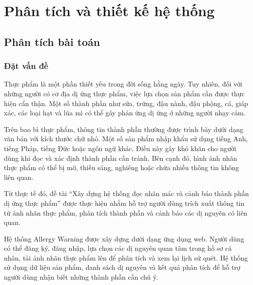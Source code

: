 
\chapter{Phân tích và thiết kế hệ thống}
\setlength{\parindent}{0pt}


\section{Phân tích bài toán}

\subsection{Đặt vấn đề}

Thực phẩm là một phần thiết yếu trong đời sống hằng ngày. Tuy nhiên, đối với những người có cơ địa dị ứng thực phẩm, việc lựa chọn sản phẩm cần được thực hiện cẩn thận. Một số thành phần như sữa, trứng, đậu nành, đậu phộng, cá, giáp xác, các loại hạt và lúa mì có thể gây phản ứng dị ứng ở những người nhạy cảm.

Trên bao bì thực phẩm, thông tin thành phần thường được trình bày dưới dạng văn bản với kích thước chữ nhỏ. Một số sản phẩm nhập khẩu sử dụng tiếng Anh, tiếng Pháp, tiếng Đức hoặc ngôn ngữ khác. Điều này gây khó khăn cho người dùng khi đọc và xác định thành phần cần tránh. Bên cạnh đó, hình ảnh nhãn thực phẩm có thể bị mờ, thiếu sáng, nghiêng hoặc chứa nhiều thông tin không liên quan.

Từ thực tế đó, đề tài ``Xây dựng hệ thống đọc nhãn mác và cảnh báo thành phần dị ứng thực phẩm'' được thực hiện nhằm hỗ trợ người dùng trích xuất thông tin từ ảnh nhãn thực phẩm, phân tích thành phần và cảnh báo các dị nguyên có liên quan.

Hệ thống Allergy Warning được xây dựng dưới dạng ứng dụng web. Người dùng có thể đăng ký, đăng nhập, lựa chọn các dị nguyên quan tâm trong hồ sơ cá nhân, tải ảnh nhãn thực phẩm lên để phân tích và xem lại lịch sử quét. Hệ thống sử dụng dữ liệu sản phẩm, danh sách dị nguyên và kết quả phân tích để hỗ trợ người dùng nhận biết những thành phần cần chú ý.


